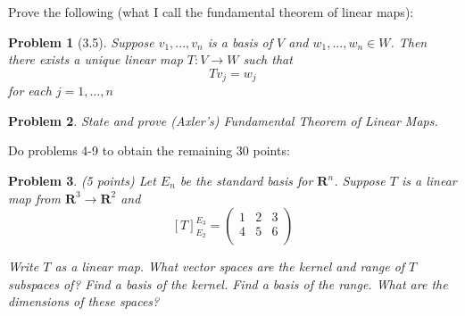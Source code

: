 \documentclass{article}
\theoremstyle{problemstyle}
\newtheorem{problem}{Problem}
\theoremstyle{problemstyle}
\newtheorem{solution}{Solution}
\theoremstyle{problemstyle}
\begin{document}
Prove the following (what I call the fundamental theorem of linear maps): 

\begin{problem}[3.5]
Suppose $v_1,...,v_n$ is a basis of $V$ and $w_1, ..., w_n \in W$. Then there exists a unique linear map $T:V \rightarrow W$ such that $$Tv_j = w_j$$ for each $j = 1,...,n$
\end{problem}


\begin{problem}
State and prove (Axler's) Fundamental Theorem of Linear Maps. 
\end{problem}


Do problems 4-9 to obtain the remaining $30$ points:

\begin{problem}
(5 points) Let $E_n$ be the standard basis for $\textbf{R}^n$. Suppose $T$ is a linear map from $\textbf{R}^3 \rightarrow \textbf{R}^2$ and 
$$[T]^{E_3}_{E_2} = \begin{pmatrix} 1 & 2 & 3  \\
 4 & 5& 6   \\
\end{pmatrix}$$

Write $T$ as a linear map. What vector spaces are the kernel and range of $T$ subspaces of?  Find a basis of the kernel. Find a basis of the range.  What are the dimensions of these spaces? 
\end{problem}
\end{document}
